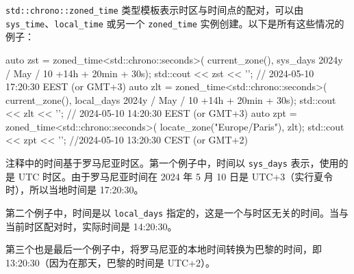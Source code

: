 \verb|std::chrono::zoned_time| 类型模板表示时区与时间点的配对，可以由 \verb|sys_time|、\verb|local_time| 或另一个 \verb|zoned_time| 实例创建。以下是所有这些情况的例子：

\begin{cpp}
auto zst = zoned_time<std::chrono::seconds>(
    current_zone(),
    sys_days{ 2024y / May / 10 } +14h + 20min + 30s);
std::cout << zst << '\n'; // 2024-05-10 17:20:30 EEST (or GMT+3)
    auto zlt = zoned_time<std::chrono::seconds>(
    current_zone(),
    local_days{ 2024y / May / 10 } +14h + 20min + 30s);
std::cout << zlt << '\n'; // 2024-05-10 14:20:30 EEST (or GMT+3)
auto zpt = zoned_time<std::chrono::seconds>(
    locate_zone("Europe/Paris"),
    zlt);
std::cout << zpt << '\n'; //2024-05-10 13:20:30 CEST (or GMT+2)
\end{cpp}

注释中的时间基于罗马尼亚时区。第一个例子中，时间以 \verb|sys_days| 表示，使用的是 UTC 时区。由于罗马尼亚时间在 2024 年 5 月 10 日是 UTC+3（实行夏令时），所以当地时间是 17:20:30。

第二个例子中，时间是以 \verb|local_days| 指定的，这是一个与时区无关的时间。当与当前时区配对时，实际时间是 14:20:30。

第三个也是最后一个例子中，将罗马尼亚的本地时间转换为巴黎的时间，即 13:20:30（因为在那天，巴黎的时间是 UTC+2）。
